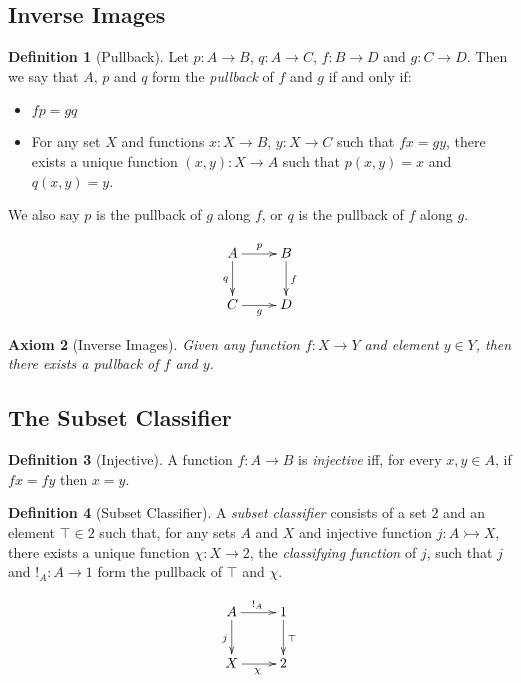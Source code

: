 \documentclass{book}
\newtheorem{ax}{Axiom}[chapter]
\theoremstyle{definition}
\newtheorem{df}[ax]{Definition}
\begin{document}
\subsection{Inverse Images}

\begin{df}[Pullback]
Let $p : A \rightarrow B$, $q : A \rightarrow C$, $f : B \rightarrow D$ and $g : C \rightarrow D$. Then we say that $A$, $p$ and $q$ form the \emph{pullback} of $f$ and $g$ if and only if:
\begin{itemize}
\item $fp = gq$
\item For any set $X$ and functions $x : X \rightarrow B$, $y : X \rightarrow C$ such that $fx = gy$, there exists a unique function $(x,y) : X \rightarrow A$ such that $p (x,y) = x$ and $q(x,y) = y$.
\end{itemize}
We also say $p$ is the pullback of $g$ along $f$, or $q$ is the pullback of $f$ along $g$.
\end{df}

\[ \xymatrix{
A \ar[r]^p \ar[d]_q & B \ar[d]^f \\
C \ar[r]_g & D
} \]

\begin{ax}[Inverse Images]
Given any function $f : X \rightarrow Y$ and element $y \in Y$, then there exists a pullback of $f$ and $y$.
\end{ax}

\subsection{The Subset Classifier}

\begin{df}[Injective]
A function $f : A \rightarrow B$ is \emph{injective} iff, for every $x,y \in A$, if $fx = fy$ then $x = y$.
\end{df}

\begin{df}[Subset Classifier]
A \emph{subset classifier} consists of a set $2$ and an element $\top \in 2$ such that, for any sets $A$ and $X$ and injective function $j : A \rightarrowtail X$, there exists a unique function $\chi : X \rightarrow 2$, the \emph{classifying function} of $j$, such that $j$ and $!_A : A \rightarrow 1$ form the pullback of $\top$ and $\chi$.
\end{df}

\[ \xymatrix{
A \ar[r]^{!_A} \ar[d]_j & 1 \ar[d]^{\top} \\
X \ar[r]_\chi & 2
} \]
\end{document}
